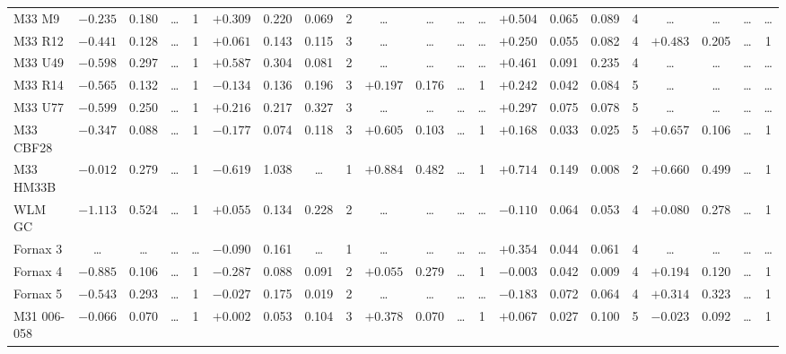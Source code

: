 \documentclass{aa}
\begin{document}
\begin{appendix}
\begin{table*}
\begin{adjustbox}{width=1\textwidth}
{\begin{tabular}{l cccccccccccccccccccc}
M33 M9        & $-0.235$ & 0.180 & \ldots & 1 & $+0.309$ & 0.220 & 0.069 & 2 & \ldots & \ldots & \ldots & \ldots & $+0.504$ & 0.065 & 0.089 & 4 & \ldots & \ldots & \ldots & \ldots \\
M33 R12       & $-0.441$ & 0.128 & \ldots & 1 & $+0.061$ & 0.143 & 0.115 & 3 & \ldots & \ldots & \ldots & \ldots & $+0.250$ & 0.055 & 0.082 & 4 & $+0.483$ & 0.205 & \ldots & 1 \\
M33 U49       & $-0.598$ & 0.297 & \ldots & 1 & $+0.587$ & 0.304 & 0.081 & 2 & \ldots & \ldots & \ldots & \ldots & $+0.461$ & 0.091 & 0.235 & 4 & \ldots & \ldots & \ldots & \ldots \\
M33 R14       & $-0.565$ & 0.132 & \ldots & 1 & $-0.134$ & 0.136 & 0.196 & 3 & $+0.197$ & 0.176 & \ldots & 1 & $+0.242$ & 0.042 & 0.084 & 5 & \ldots & \ldots & \ldots & \ldots \\
M33 U77       & $-0.599$ & 0.250 & \ldots & 1 & $+0.216$ & 0.217 & 0.327 & 3 & \ldots & \ldots & \ldots & \ldots & $+0.297$ & 0.075 & 0.078 & 5 & \ldots & \ldots & \ldots & \ldots \\
M33 CBF28     & $-0.347$ & 0.088 & \ldots & 1 & $-0.177$ & 0.074 & 0.118 & 3 & $+0.605$ & 0.103 & \ldots & 1 & $+0.168$ & 0.033 & 0.025 & 5 & $+0.657$ & 0.106 & \ldots & 1 \\
M33 HM33B     & $-0.012$ & 0.279 & \ldots & 1 & $-0.619$ & 1.038 & \ldots & 1 & $+0.884$ & 0.482 & \ldots & 1 & $+0.714$ & 0.149 & 0.008 & 2 & $+0.660$ & 0.499 & \ldots & 1 \\
WLM GC        & $-1.113$ & 0.524 & \ldots & 1 & $+0.055$ & 0.134 & 0.228 & 2 & \ldots & \ldots & \ldots & \ldots & $-0.110$ & 0.064 & 0.053 & 4 & $+0.080$ & 0.278 & \ldots & 1 \\
Fornax 3      & \ldots & \ldots & \ldots & \ldots & $-0.090$ & 0.161 & \ldots & 1 & \ldots & \ldots & \ldots & \ldots & $+0.354$ & 0.044 & 0.061 & 4 & \ldots & \ldots & \ldots & \ldots \\
Fornax 4      & $-0.885$ & 0.106 & \ldots & 1 & $-0.287$ & 0.088 & 0.091 & 2 & $+0.055$ & 0.279 & \ldots & 1 & $-0.003$ & 0.042 & 0.009 & 4 & $+0.194$ & 0.120 & \ldots & 1 \\
Fornax 5      & $-0.543$ & 0.293 & \ldots & 1 & $-0.027$ & 0.175 & 0.019 & 2 & \ldots & \ldots & \ldots & \ldots & $-0.183$ & 0.072 & 0.064 & 4 & $+0.314$ & 0.323 & \ldots & 1 \\
M31 006-058   & $-0.066$ & 0.070 & \ldots & 1 & $+0.002$ & 0.053 & 0.104 & 3 & $+0.378$ & 0.070 & \ldots & 1 & $+0.067$ & 0.027 & 0.100 & 5 & $-0.023$ & 0.092 & \ldots & 1 \\

\end{tabular}}
\end{adjustbox}
\end{table*}
\end{appendix}
\end{document}
